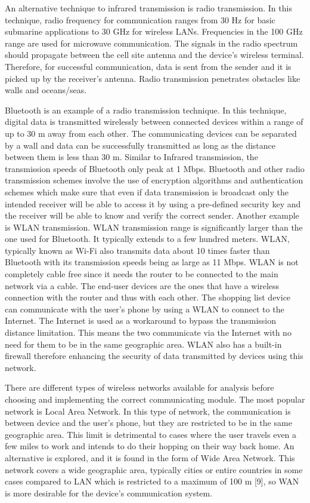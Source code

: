An alternative technique to infrared transmission is radio transmission. In this technique, radio frequency for communication ranges from 30 Hz for basic submarine applications to 30 GHz for wireless LANs. Frequencies in the 100 GHz range are used for microwave communication. The signals in the radio spectrum should propagate between the cell site antenna and the device’s wireless terminal. Therefore, for successful communication, data is sent from the sender and it is picked up by the receiver’s antenna. Radio transmission penetrates obstacles like walls and oceans/seas.

Bluetooth is an example of a radio transmission technique. In this technique, digital data is transmitted wirelessly between connected devices within a range of up to 30 m away from each other. The communicating devices can be separated by a wall and data can be successfully transmitted as long as the distance between them is less than 30 m. Similar to Infrared transmission, the transmission speeds of Bluetooth only peak at 1 Mbps. Bluetooth and other radio transmission schemes involve the use of encryption algorithms and authentication schemes which make sure that even if data transmission is broadcast only the intended receiver will be able to access it by using a pre-defined security key and the receiver will be able to know and verify the correct sender. Another example is WLAN transmission. WLAN transmission range is significantly larger than the one used for Bluetooth. It typically extends to a few hundred meters. WLAN, typically known as Wi-Fi also transmits data about 10 times faster than Bluetooth with its transmission speeds being as large as 11 Mbps. WLAN is not completely cable free since it needs the router to be connected to the main network via a cable. The end-user devices are the ones that have a wireless connection with the router and thus with each other.  The shopping list device can communicate with the user’s phone by using a WLAN to connect to the Internet. The Internet is used as a workaround to bypass the transmission distance limitation. This means the two communicate via the Internet with no need for them to be in the same geographic area. WLAN also has a built-in firewall therefore enhancing the security of data transmitted by devices using this network.

There are different types of wireless networks available for analysis before choosing and implementing the correct communicating module. The most popular network is Local Area Network. In this type of network, the communication is between device and the user’s phone, but they are restricted to be in the same geographic area. This limit is detrimental to cases where the user travels even a few miles to work and intends to do their hopping on their way back home. An alternative is explored, and it is found in the form of Wide Area Network. This network covers a wide geographic area, typically cities or entire countries in some cases compared to LAN which is restricted to a maximum of 100 m [9], so WAN is more desirable for the device’s communication system.

